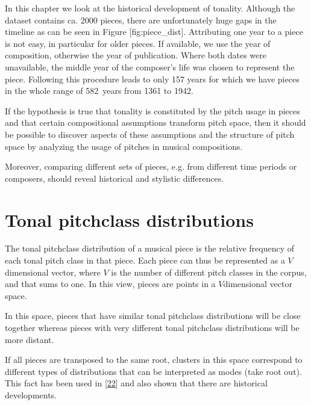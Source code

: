\documentclass[letterpaper,10pt,english]{sphinxmanual}
\begin{document}
\sphinxAtStartPar
In this chapter we look at the historical development of tonality.
Although the dataset contains ca. 2000 pieces, there are unfortunately
huge gaps in the timeline as can be seen in Figure {[}fig:piece\_dist{]}.
Attributing one year to a piece is not easy, in particular for older
pieces. If available, we use the year of composition, otherwise the year
of publication. Where both dates were unavailable, the middle year of
the composer’s life was chosen to represent the piece. Following this
procedure leads to only 157 years for which we have pieces in the whole
range of 582 years from 1361 to 1942.

\sphinxAtStartPar
If the hypothesis is true that tonality is constituted by the pitch
usage in pieces and that certain compositional assumptions transform
pitch space, then it should be possible to discover aspects of these
assumptions and the structure of pitch space by analyzing the usage of
pitches in musical compositions.

\sphinxAtStartPar
Moreover, comparing different sets of pieces, e.g. from different time
periods or composers, should reveal historical and stylistic
differences.


\chapter{Tonal pitch\sphinxhyphen{}class distributions}
\label{\detokenize{pc_distributions:tonal-pitch-class-distributions}}\label{\detokenize{pc_distributions::doc}}
\sphinxAtStartPar
The tonal pitch\sphinxhyphen{}class distribution of a musical piece is the relative
frequency of each tonal pitch class in that piece. Each piece can thus
be represented as a \(V\)\sphinxhyphen{}dimensional vector, where \(V\) is the
number of different pitch classes in the corpus, and that sums to one.
In this view, pieces are points in a \(V\)\sphinxhyphen{}dimensional vector space.

\sphinxAtStartPar
In this space, pieces that have similar tonal pitch\sphinxhyphen{}class distributions
will be close together whereas pieces with very different tonal
pitch\sphinxhyphen{}class distributions will be more distant.

\sphinxAtStartPar
If all pieces are transposed to the same root, clusters in this space
correspond to different types of distributions that can be interpreted
as modes (take root out). This fact has been used in
{[}\hyperlink{cite.8_bibliography:id74}{22}{]}
and also shown that there are historical developments.
\end{document}
